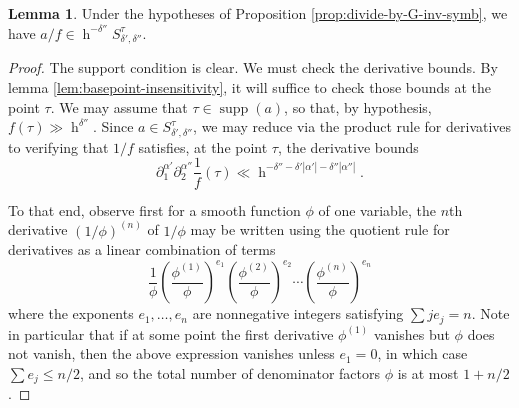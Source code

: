 \documentclass[reqno]{amsart}
\DeclareMathOperator{\h}{h}
\DeclareMathOperator{\supp}{supp}
\theoremstyle{plain} \newtheorem{theorem} {Theorem}
\theoremstyle{definition} \newtheorem{definition} [theorem] {Definition}
\theoremstyle{itplain} %
\newtheorem{lemma}[theorem]{Lemma}
\numberwithin{equation}{section}
\numberwithin{theorem}{section}
\renewcommand{\leq}{\leqslant}
\begin{document}
\begin{lemma}\label{lem:b0-in-h-neg-delta-dubprime}
  Under the hypotheses of Proposition \ref{prop:divide-by-G-inv-symb}, we have $a/f \in \h^{- \delta ''} S_{\delta', \delta ''}^{\tau}$.
\end{lemma}
\begin{proof}
  The support condition is clear.  We must check the derivative bounds.  By lemma \ref{lem:basepoint-insensitivity}, it will suffice to check those bounds at the point $\tau$.  We may assume that $\tau \in \supp(a)$, so that, by hypothesis, $f(\tau) \gg \h^{\delta ''}$.  Since $a \in S^\tau_{\delta ', \delta ''}$, we may reduce via the product rule for derivatives to verifying that $1/f$ satisfies, at the point $\tau$, the derivative bounds
  \begin{equation}\label{eqn:required-partials-for-1-over-f}
    \partial_{1}^{\alpha '}
    \partial_{2}^{\alpha ''} \frac{1}{f}(\tau) \ll
    \h^{- \delta '' - \delta ' |\alpha'| - \delta '' |\alpha ''|}.
  \end{equation}

  To that end, observe first for a smooth function $\phi$ of one variable, the $n$th derivative $(1/\phi)^{(n)}$ of $1/\phi$ may be written using the quotient rule for derivatives as a linear combination of terms
  \[
    \frac{1}{\phi } \left( \frac{\phi^{(1)} }{\phi } \right)^{e_1} \left( \frac{\phi^{(2)} }{\phi } \right)^{e_2} \dotsb \left( \frac{\phi^{(n)} }{\phi } \right)^{e_n}
  \]
  where the exponents $e_1,\dotsc,e_n$ are nonnegative integers satisfying $\sum j e_j = n$.  Note in particular that if at some point the first derivative $\phi^{(1)}$ vanishes but $\phi$ does not vanish, then the above expression vanishes unless $e_1 = 0$, in which case $\sum e_j \leq n/2$, and so the total number of denominator factors $\phi$ is at most $1 + n/2$ .


\end{proof}
\end{document}

